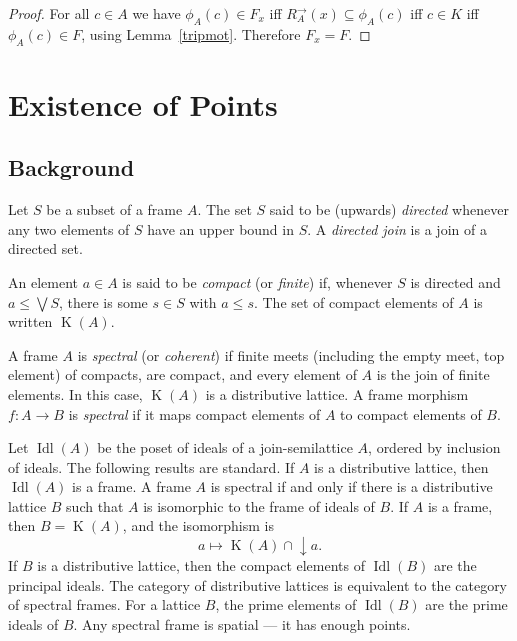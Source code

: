 \documentclass{article}[a4paper]
\theoremstyle{definition}
\newcommand{\dirim}{^{\rightarrow\!}}
\DeclareMathOperator{\downset}{\downarrow}
\DeclareMathOperator{\compacts}{K}
\DeclareMathOperator{\ideals}{Idl}
\begin{document}
\begin{proof}
For all $c \in A$ we have 
$\phi _A (c) \in F_x$ iff   
$R_A \dirim (x)  \subseteq \phi_A (c)$
iff 
$c \in K$ 
iff 
 $\phi _A (c) \in F$,                             
using Lemma~\ref{tripmot}. Therefore $F_x  = F$.
\end{proof}

\section{Existence of Points}
\label{sec:existence}

\subsection{Background}

Let $S$ be a subset of a frame $A$. The set $S$ said to be (upwards) \emph{directed} whenever any two elements of $S$ have an upper bound in $S$. A \emph{directed join} is a join of a directed set.

An element $a\in A$ is said to be \emph{compact} (or \emph{finite}) if, whenever $S$ is directed and $a \leq \bigvee S$, there is some $s \in S$ with $a \leq s$. The set of compact elements of $A$ is written $\compacts(A)$.

A frame $A$ is \emph{spectral} (or \emph{coherent}) if finite meets (including the empty meet, top element) of compacts, are compact, and every element of $A$ is the join of finite elements. In this case, $\compacts(A)$ is a distributive lattice.
A frame morphism $f: A \longrightarrow B$ is \emph{spectral} if it maps compact elements of $A$ to compact elements of $B$.

Let $\ideals(A)$ be the poset of ideals of a join-semilattice $A$, ordered by inclusion of ideals. The following results are standard. If $A$ is a distributive lattice, then $\ideals (A)$ is a frame. 
A frame $A$ is spectral if and only if there is a distributive lattice $B$ such that $A$ is isomorphic to the frame of ideals of $B$.  
If $A$ is a frame, then $B = \compacts (A)$, and the isomorphism is 
\begin{equation}
\label{def:mapToCompacts}
a \mapsto \compacts(A) \cap \downset a . 
\end{equation}If $B$ is a distributive lattice, then the compact elements of $\ideals(B)$ are the principal ideals. 
The category of distributive lattices is equivalent to the category of spectral frames. 
For a lattice $B$, the prime elements of $\ideals(B)$ are the prime ideals of $B$. 
Any spectral frame is spatial --- it has enough points. 
%
 
\end{document}
